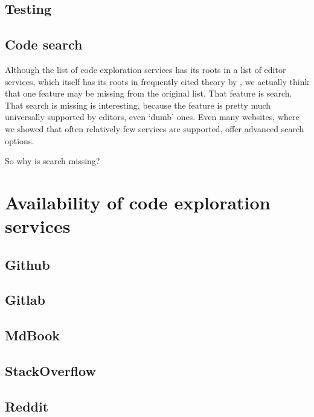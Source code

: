 \subsection*{Testing}


\subsection{Code search}\label{subsec:code-search}

Although the list of code exploration services has its roots in a list of editor services, which itself has its roots in
frequently cited theory by \citeauthor{ErdwegSV13}, we actually think that one feature may be missing from the original list.
That feature is search.
That search is missing is interesting, because the feature is pretty much universally supported by editors, even `dumb' ones.
Even many websites, where we showed that often relatively few services are supported, offer advanced search options.

So why is search missing?


\section{Availability of code exploration services}\label{sec:availability-of-code-exploration-services}




\subsection{Github}
\subsection{Gitlab}
\subsection{MdBook}
\subsection{StackOverflow}
\subsection{Reddit}
